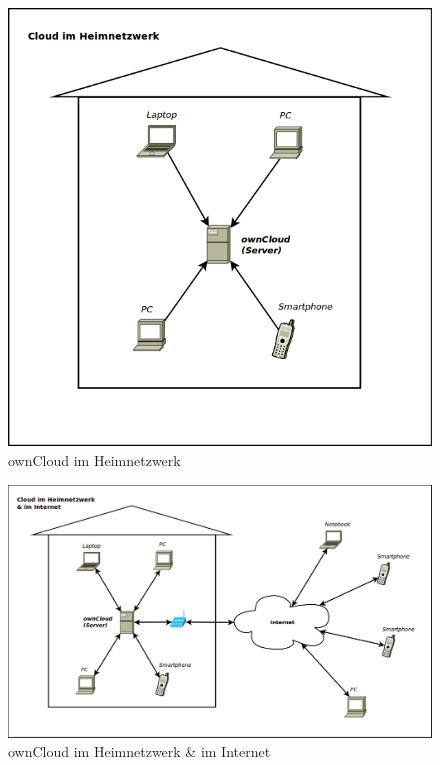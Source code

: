 \begin{figure}[h]
\centering
\includegraphics[scale=0.45]{images/owncloud_homenetwork}
\caption{ownCloud im Heimnetzwerk}
\end{figure}

\begin{figure}[h]
\centering
\includegraphics[scale=0.45]{images/owncloud_widenetwork}
\caption{ownCloud im Heimnetzwerk \& im Internet}
\end{figure}

\newpage
